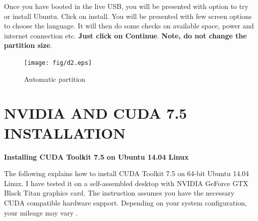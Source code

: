 \documentclass[12pt]{article}
\begin{document}
Once you have booted in the live USB, you will be presented with option to try or install Ubuntu. Click on install. You will be presented with few screen options to choose the language. It will then do some checks on available space, power and internet connection etc. \textbf{Just click on Continue}. \textbf{Note, do not change the partition size}.
\begin{figure}[h]
\centering \texttt{[image: fig/d2.eps]}
\caption{Automatic partition}
\end{figure}

\newpage


\section{NVIDIA AND CUDA 7.5 INSTALLATION}

\textbf{Installing CUDA Toolkit 7.5 on Ubuntu 14.04 Linux}

The following explains how to install CUDA Toolkit 7.5 on 64-bit Ubuntu 14.04 Linux. I have tested it on a self-assembled desktop with NVIDIA GeForce GTX Black Titan graphics card. The instruction assumes you have the necessary CUDA compatible hardware support. Depending on your system configuration, your mileage may vary \cite{NVIDIADRIVER}.
\end{document}
